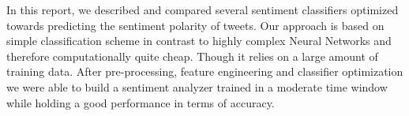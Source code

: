 In this report, we described and compared several sentiment classifiers optimized towards predicting the sentiment polarity of tweets. 
Our approach is based on simple classification scheme in contrast to highly complex Neural Networks and therefore computationally quite cheap.
Though it relies on a large amount of training data.
After pre-processing, feature engineering and classifier optimization we were able to build a sentiment analyzer trained in a moderate time window while holding a good performance in terms of accuracy.